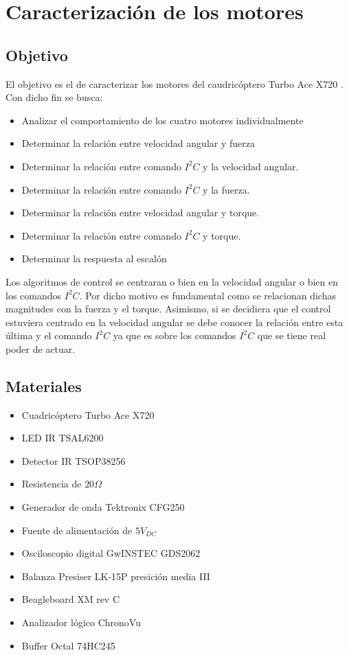 \documentclass[main]{subfiles}
\begin{document}
\chapter{Caracterizaci\'on de los motores}
\section{Objetivo}
El objetivo es el de caracterizar los motores del caudric\'optero Turbo Ace X720 . Con dicho fin se busca:

\begin{itemize}
\item Analizar el comportamiento de los cuatro motores individualmente
\item Determinar la relaci\'on entre velocidad angular y fuerza
\item Determinar la relaci\'on entre comando $I^2C$ y la velocidad angular.
\item Determinar la relaci\'on entre comando $I^2C$ y la fuerza.
\item Determinar la relaci\'on entre velocidad angular y torque.
\item Determinar la relaci\'on entre comando $I^2C$ y torque.
\item Determinar la respuesta al escal\'on
\end{itemize}

Los algoritmos de control se centraran o bien en la velocidad angular o bien en los comandos $I^2C$. Por dicho motivo es fundamental como se relacionan dichas magnitudes con la fuerza y el torque. Asimismo, si se decidiera que el control estuviera centrado en la velocidad angular se debe conocer la relaci\'on entre esta \'ultima y el comando $I^2C$ ya que es sobre los comandos $I^2C$ que se tiene real poder de actuar.

\section{Materiales}
\begin{itemize}
\item Cuadric\'optero Turbo Ace X720	
\item LED IR TSAL6200
\item Detector IR TSOP38256
\item Resistencia de $20 \Omega$
\item Generador de onda Tektronix CFG250
\item Fuente de alimentaci\'on de $5V_{DC}$
\item Osciloscopio digital GwINSTEC GDS2062
\item Balanza Presiser LK-15P presici\'on media III
\item Beagleboard XM rev C
\item Analizador l\'ogico ChronoVu
\item Buffer Octal 74HC245
\end{itemize}
\end{document}
